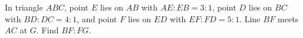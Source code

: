 In triangle $ABC$, point $E$ lies on $AB$ with $AE:EB=3:1$, point $D$ lies on $BC$ with $BD:DC=4:1$, and point $F$ lies on $ED$ with $EF:FD=5:1$. Line $BF$ meets $AC$ at $G$. Find $BF:FG$.
